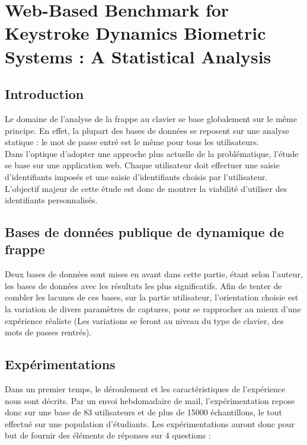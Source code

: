 \section{Web-Based Benchmark for Keystroke Dynamics Biometric Systems : A Statistical Analysis\cite{giotWeb}}

\subsection{Introduction}

Le domaine de l'analyse de la frappe au clavier se base globalement sur le même principe. En effet, la plupart des bases de données se reposent sur une analyse statique : le mot de passe entré est le même pour tous les utilisateurs.\\

Dans l'optique d'adopter une approche plus actuelle de la problématique, l'étude se base sur une application web. Chaque utilisateur doit effectuer une saisie d'identifiants imposés et une saisie d'identifiants choisis par l'utilisateur. L'objectif majeur de cette étude est donc de montrer la viabilité d'utiliser des identifiants personnalisés.

\subsection{Bases de données publique de dynamique de frappe}
 
Deux bases de données sont mises en avant dans cette partie, étant selon l'auteur, les bases de données avec les résultats les plus significatifs. Afin de tenter de combler les lacunes de ces bases, sur la partie utilisateur, l'orientation choisie est la variation de divers paramètres de captures, pour se rapprocher au mieux d'une expérience réaliste (Les variations se feront au niveau du type de clavier, des mots de passes rentrés).

\subsection{Expérimentations}

Dans un premier temps, le déroulement et les caractéristiques de l'expérience nous sont décrits. Par un envoi hebdomadaire de mail, l'expérimentation repose donc sur une base de 83 utilisateurs  et de plus de 15000 échantillons, le tout effectué sur une population d'étudiants. Les expérimentations auront donc pour but de fournir des éléments de réponses sur 4 questions :\\

